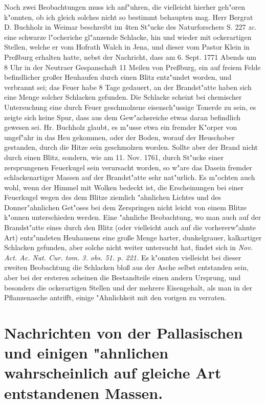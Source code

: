 \documentclass[a4paper, 11pt, oneside, polutonikogreek, german]{article}
\begin{document}
Noch zwei Beobachtungen muss ich anf"uhren, die vielleicht hierher geh"oren k"onnten, ob ich gleich solches nicht so bestimmt behaupten mag. Herr Bergrat D. Buchholz in Weimar beschreibt im 4ten St"ucke des Naturforschers S. 227 \emph{zc.} eine schwarze l"ocheriche gl"anzende Schlacke, hin und wieder mit ockerartigen Stellen, welche er vom Hofrath Walch in Jena, und dieser vom Pastor Klein in Preßburg erhalten hatte, nebst der Nachricht, dass am 6. Sept. 1771 Abends um 8 Uhr in der Neutraer Gespanschaft 11 Meilen von Preßburg, ein auf freiem Felde befindlicher großer Heuhaufen durch einen Blitz entz"undet worden, und verbrannt sei; das Feuer habe 8 Tage gedauert, an der Brandst"atte haben sich eine Menge solcher Schlacken gefunden. Die Schlacke scheint bei chemischer Untersuchung eine durch Feuer geschmolzene eisensch"ussige Tonerde zu sein, es zeigte sich keine Spur, dass aus dem Gew"achsreiche etwas daran befindlich gewesen sei. Hr. Buchholz glaubt, es m"usse etwa ein fremder K"orper von ungef"ahr in das Heu gekommen, oder der Boden, worauf der Heuschober gestanden, durch die Hitze sein geschmolzen worden. Sollte aber der Brand nicht durch einen Blitz, sondern, wie am 11. Nov. 1761, durch St"ucke einer zersprungenen Feuerkugel sein verursacht worden, so w"are das Dasein fremder schlackenartiger Massen auf der Brandst"atte sehr nat"urlich. Es m"ochten auch wohl, wenn der Himmel mit Wolken bedeckt ist, die Erscheinungen bei einer Feuerkugel wegen des dem Blitze ziemlich "ahnlichen Lichtes und des Donner"ahnlichen Get"oses bei dem Zerspringen nicht leicht von einem Blitze k"onnen unterschieden werden. Eine "ahnliche Beobachtung, wo man auch auf der Brandst"atte eines durch den Blitz (oder vielleicht auch auf die vorhererw"ahnte Art) entz"undeten Heuhausens eine große Menge harter, dunkelgrauer, kalkartiger Schlacken gefunden, aber solche nicht weiter untersucht hat, findet sich in \emph{Nov. Act. Ac. Nat. Cur. tom. 3. obs. 51. p. 221.} Es k"onnten vielleicht bei dieser zweiten Beobachtung die Schlacken bloß aus der Asche selbst entstanden sein, aber bei der ersteren scheinen die Bestandteile einen andern Ursprung, und besonders die ockerartigen Stellen und der mehrere Eisengehalt, als man in der Pflanzenasche antrifft, einige "Ahnlichkeit mit den vorigen zu verraten.
\clearpage
\section{Nachrichten von der Pallasischen und einigen "ahnlichen wahrscheinlich auf gleiche Art entstandenen Massen.}
\end{document}
